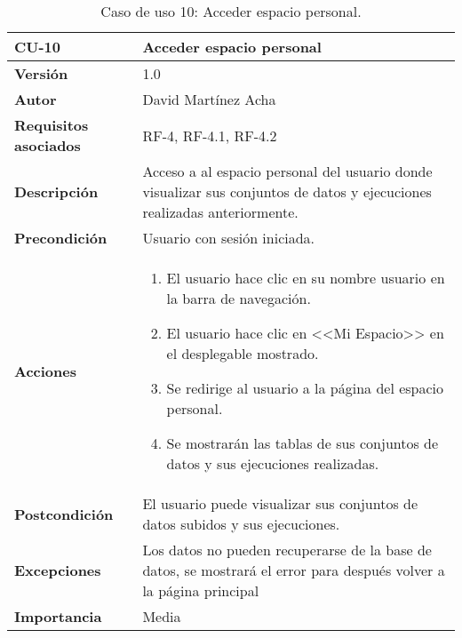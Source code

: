 \begin{table}[p]
	\centering
	\begin{tabularx}{\linewidth}{ p{} p{} }
		\toprule
		\textbf{CU-10}    & \textbf{Acceder espacio personal}\\
		\toprule
		\textbf{Versión}              & 1.0    \\
		\textbf{Autor}                & David Martínez Acha \\
		\textbf{Requisitos asociados} & RF-4, RF-4.1, RF-4.2 \\
		\textbf{Descripción}          & Acceso a al espacio personal del usuario donde visualizar sus conjuntos de datos y ejecuciones realizadas anteriormente. \\
		\textbf{Precondición}         & Usuario con sesión iniciada. \\
		\textbf{Acciones}             &
		\begin{enumerate}
			\def\labelenumi{\arabic{enumi}.}
			\tightlist
			\item El usuario hace clic en su nombre usuario en la barra de navegación.
			\item El usuario hace clic en <<Mi Espacio>> en el desplegable mostrado.
			\item Se redirige al usuario a la página del espacio personal.
			\item Se mostrarán las tablas de sus conjuntos de datos y sus ejecuciones realizadas.
		\end{enumerate}\\
		\textbf{Postcondición}        & El usuario puede visualizar sus conjuntos de datos subidos y sus ejecuciones. \\
		\textbf{Excepciones}          & Los datos no pueden recuperarse de la base de datos, se mostrará el error para después volver a la página principal\\
		\textbf{Importancia}          & Media \\
		\bottomrule
	\end{tabularx}
	\caption{Caso de uso 10: Acceder espacio personal.}
\end{table}


